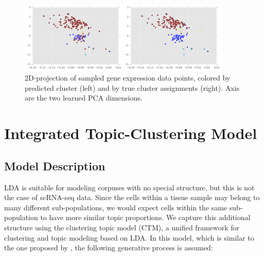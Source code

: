 \documentclass{article}
\begin{document}
\begin{figure}[ht]
    \centering
    \includegraphics[width=0.9\textwidth]{figs/totalclusters}
    \caption{2D-projection of sampled gene expression data points, colored by predicted cluster (left) and by true cluster assignments (right). Axis are the two learned PCA dimensions.}
    \label{fig:mmplot}
\vskip -0.2in
\end{figure} 


\section{Integrated Topic-Clustering Model} 
\label{intsec}
\subsection{Model Description}
LDA is suitable for modeling corpuses with no special structure, but this is not the case of scRNA-seq data. Since the cells within a tissue sample may belong to many different sub-populations, we would expect cells within the same sub-population to have more similar topic proportions. We capture this additional structure using the clustering topic model (CTM), a unified framework for clustering and topic modeling based on LDA. In this model, which is similar to the one proposed by \cite{wallach_thesis}, the following generative process is assumed:
\end{document}
